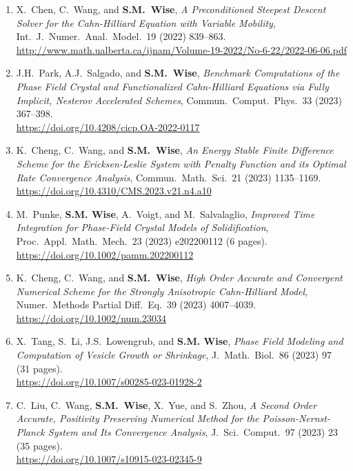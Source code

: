 \documentclass[11pt]{letter}
\begin{document}
\begin{enumerate}
	\item
X.~Chen, C.~Wang, and \textbf{S.M.~Wise}, {\sl A Preconditioned Steepest Descent Solver for the Cahn-Hilliard Equation with Variable Mobility}, Int.~J.~Numer.~Anal.~Model.~19 (2022) 839--863.
	\\
\url{http://www.math.ualberta.ca/ijnam/Volume-19-2022/No-6-22/2022-06-06.pdf}

	\item
J.H.~Park, A.J.~Salgado, and \textbf{S.M.~Wise}, {\sl Benchmark Computations of the Phase Field Crystal and Functionalized Cahn-Hilliard Equations via Fully Implicit, Nesterov Accelerated Schemes}, Commun.~Comput.~Phys.~33 (2023) 367--398.
	\\
\url{https://doi.org/10.4208/cicp.OA-2022-0117}

	\item
K.~Cheng, C.~Wang, and \textbf{S.M.~Wise}, {\sl An Energy Stable Finite Difference Scheme for the Ericksen-Leslie System with Penalty Function and its Optimal Rate Convergence Analysis}, Commun.~Math.~Sci.~21 (2023)  1135--1169.
	\\
\url{https://doi.org/10.4310/CMS.2023.v21.n4.a10}

	\item
M.~Punke, \textbf{S.M. Wise}, A.~Voigt, and M.~Salvalaglio, {\sl Improved Time Integration for Phase-Field Crystal Models of Solidification}, Proc.~Appl.~Math.~Mech.~23 (2023) e202200112 (6 pages).
	\\
\url{https://doi.org/10.1002/pamm.202200112}

	\item
K.~Cheng, C.~Wang, and \textbf{S.M.~Wise}, {\sl High Order Accurate and Convergent Numerical Scheme for the Strongly Anisotropic Cahn-Hilliard Model}, Numer.~Methods Partial Diff.~Eq.~39 (2023) 4007--4039.
	\\
\url{https://doi.org/10.1002/num.23034}

	\item
X.~Tang, S.~Li, J.S.~Lowengrub, and \textbf{S.M. Wise}, {\sl Phase Field Modeling and Computation of Vesicle Growth or Shrinkage}, J.~Math.~Biol.~86 (2023) 97 (31 pages).
	\\
\url{https://doi.org/10.1007/s00285-023-01928-2}

	\item
C.~Liu, C.~Wang, \textbf{S.M.~Wise}, X.~Yue, and S.~Zhou, {\sl A Second Order Accurate, Positivity Preserving Numerical Method for the Poisson-Nernst-Planck System and Its Convergence Analysis}, J.~Sci.~Comput.~97 (2023) 23 (35 pages).
	\\
\url{https://doi.org/10.1007/s10915-023-02345-9}	


\end{enumerate}
\end{document}
